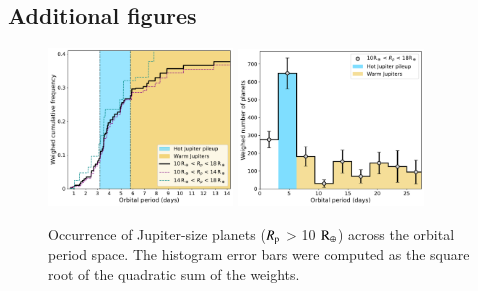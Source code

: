 \documentclass[]{aa}
\begin{document}
\begin{appendix}

\section{Additional figures}

\begin{figure}
    \centering
    \includegraphics[width=0.4363\textwidth]{cumulative_giant.pdf}
    \includegraphics[width=0.44\textwidth]{oc_giant.pdf}
    \caption{Occurrence of Jupiter-size planets ($R_{\rm p}$ > 10 $\rm R_{\oplus}$) across the orbital period space. The histogram error bars were computed as the square root of the quadratic sum of the weights.}
    \label{fig:oc_jup}
\end{figure}


\end{appendix}
\end{document}

